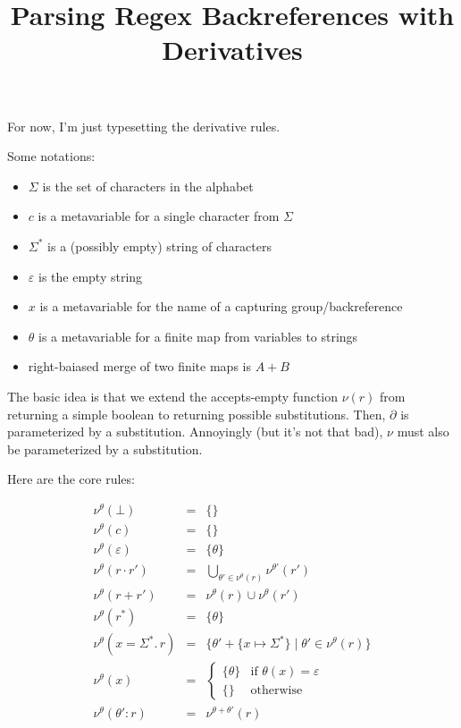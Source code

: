 \documentclass[11pt]{amsart}
\title{Parsing Regex Backreferences with Derivatives}
\author{}
\begin{document}
\maketitle

For now, I'm just typesetting the derivative rules.

Some notations:
\begin{itemize}
\item $\Sigma$ is the set of characters in the alphabet
\item $c$ is a metavariable for a single character from $\Sigma$
\item $\Sigma^*$ is a (possibly empty) string of characters
\item $\varepsilon$ is the empty string
\item $x$ is a metavariable for the name of a capturing group/backreference
\item $\theta$ is a metavariable for a finite map from variables to strings
\item right-baiased merge of two finite maps is $A + B$
\end{itemize}

The basic idea is that we extend the accepts-empty function $\nu(r)$ from returning a simple boolean to returning possible substitutions.
Then, $\partial$ is parameterized by a substitution.
Annoyingly (but it's not that bad), $\nu$ must also be parameterized by a substitution.

Here are the core rules:

$$
\begin{array}{rcl}
\nu^\theta(\bot) &=& \{\} \\
\nu^\theta(c) &=& \{\} \\
\nu^\theta(\varepsilon) &=& \{\theta\} \\
\nu^\theta(r \cdot r') &=&
	\bigcup_{\theta' \in \nu^\theta(r)}
		\nu^{\theta'}(r') \\
\nu^\theta(r + r') &=& \nu^\theta(r) \cup \nu^\theta(r') \\
\nu^\theta(r^*) &=& \{\theta\} \\
\nu^\theta(x{=}\Sigma^*.\,r) &=&
	\{ \theta' + \{x \mapsto \Sigma^*\}
	\mid \theta' \in \nu^\theta(r)
	\} \\
\nu^\theta(x) &=&
	\begin{cases}
	\{\theta\} & \textrm{if }\theta(x) = \varepsilon \\
	\{\} & \textrm{otherwise}
	\end{cases} \\
\nu^\theta(\theta'{:r}) &=& \nu^{\theta + \theta'}(r) \\
\end{array}
$$
\end{document}
